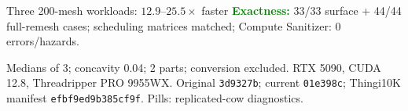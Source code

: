 \documentclass[aspectratio=169,10pt]{beamer}
\begin{document}
\begin{frame}[t]{Three 200-mesh workloads: $12.9$--$25.5\times$ faster}
  \vspace{0.01cm}
  {\fontsize{4.6}{5.2}\selectfont
    \textcolor{Green}{\bfseries Exactness:} 33/33 surface + 44/44 full-remesh cases; scheduling matrices matched; Compute Sanitizer: 0 errors/hazards.}

  \vspace{0.02cm}
  {\fontsize{4.0}{4.6}\selectfont\textcolor{Muted}{Medians of 3; concavity 0.04; 2 parts; conversion excluded. RTX 5090, CUDA 12.8, Threadripper PRO 9955WX. Original \texttt{3d9327b}; current \texttt{01e398c}; Thingi10K manifest \texttt{efbf9ed9b385cf9f}. Pills: replicated-cow diagnostics.}}
\end{frame}
\end{document}
